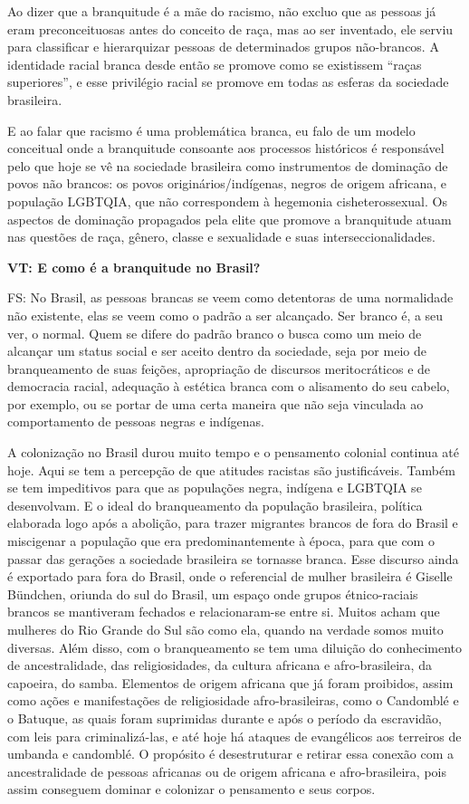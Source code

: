 \documentclass[a4paper,
fontsize=11pt,
oneside,
numbers=noperiodatend,
parskip=half-,
bibliography=totoc,
final
]{scrartcl}
\begin{document}
Ao dizer que a branquitude é a mãe do racismo, não excluo que as pessoas
já eram preconceituosas antes do conceito de raça, mas ao ser inventado,
ele serviu para classificar e hierarquizar pessoas de determinados
grupos não-brancos. A identidade racial branca desde então se promove
como se existissem \enquote{raças superiores}, e esse privilégio racial
se promove em todas as esferas da sociedade brasileira.

E ao falar que racismo é uma problemática branca, eu falo de um modelo
conceitual onde a branquitude consoante aos processos históricos é
responsável pelo que hoje se vê na sociedade brasileira como
instrumentos de dominação de povos não brancos: os povos
originários/indígenas, negros de origem africana, e população LGBTQIA,
que não correspondem à hegemonia cisheterossexual. Os aspectos de
dominação propagados pela elite que promove a branquitude atuam nas
questões de raça, gênero, classe e sexualidade e suas
interseccionalidades.

\textbf{VT: E como é a branquitude no Brasil?}

FS: No Brasil, as pessoas brancas se veem como detentoras de uma
normalidade não existente, elas se veem como o padrão a ser alcançado.
Ser branco é, a seu ver, o normal. Quem se difere do padrão branco o
busca como um meio de alcançar um status social e ser aceito dentro da
sociedade, seja por meio de branqueamento de suas feições, apropriação
de discursos meritocráticos e de democracia racial, adequação à estética
branca com o alisamento do seu cabelo, por exemplo, ou se portar de uma
certa maneira que não seja vinculada ao comportamento de pessoas negras
e indígenas.

A colonização no Brasil durou muito tempo e o pensamento colonial
continua até hoje. Aqui se tem a percepção de que atitudes racistas são
justificáveis. Também se tem impeditivos para que as populações negra,
indígena e LGBTQIA se desenvolvam. E o ideal do branqueamento da
população brasileira, política elaborada logo após a abolição, para
trazer migrantes brancos de fora do Brasil e miscigenar a população que
era predominantemente à época, para que com o passar das gerações a
sociedade brasileira se tornasse branca. Esse discurso ainda é exportado
para fora do Brasil, onde o referencial de mulher brasileira é Giselle
Bündchen, oriunda do sul do Brasil, um espaço onde grupos étnico-raciais
brancos se mantiveram fechados e relacionaram-se entre si. Muitos acham
que mulheres do Rio Grande do Sul são como ela, quando na verdade somos
muito diversas. Além disso, com o branqueamento se tem uma diluição do
conhecimento de ancestralidade, das religiosidades, da cultura africana
e afro-brasileira, da capoeira, do samba. Elementos de origem africana
que já foram proibidos, assim como ações e manifestações de
religiosidade afro-brasileiras, como o Candomblé e o Batuque, as quais
foram suprimidas durante e após o período da escravidão, com leis para
criminalizá-las, e até hoje há ataques de evangélicos aos terreiros de
umbanda e candomblé. O propósito é desestruturar e retirar essa conexão
com a ancestralidade de pessoas africanas ou de origem africana e
afro-brasileira, pois assim conseguem dominar e colonizar o pensamento e
seus corpos.
\end{document}
